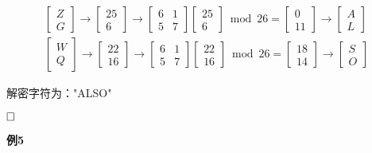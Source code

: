 \documentclass{article}
\begin{document}
$$
\begin{array}{l}
{\left[\begin{array}{l}
Z \\
G
\end{array}\right] \rightarrow\left[\begin{array}{c}
25 \\
6
\end{array}\right] \rightarrow\left[\begin{array}{ll}
6 & 1 \\
5 & 7
\end{array}\right]\left[\begin{array}{c}
25 \\
6
\end{array}\right] \bmod 26=\left[\begin{array}{l}
0 \\
11
\end{array}\right] \rightarrow\left[\begin{array}{l}
A \\
L
\end{array}\right]} \\
\left[\begin{array}{l}
W \\
Q
\end{array}\right] \rightarrow\left[\begin{array}{l}
22 \\
16
\end{array}\right] \rightarrow\left[\begin{array}{ll}
6&1 \\
5&7
\end{array}\right]\left[\begin{array}{l}
22 \\
16
\end{array}\right] \bmod 26 =\left[\begin{array}{l}
18 \\
14
\end{array}\right] \rightarrow\left[\begin{array}{l}
S \\
O
\end{array}\right]
\end{array}
$$

解密字符为："ALSO"

$\hfill\square$ 

\textbf{例5}
\end{document}
